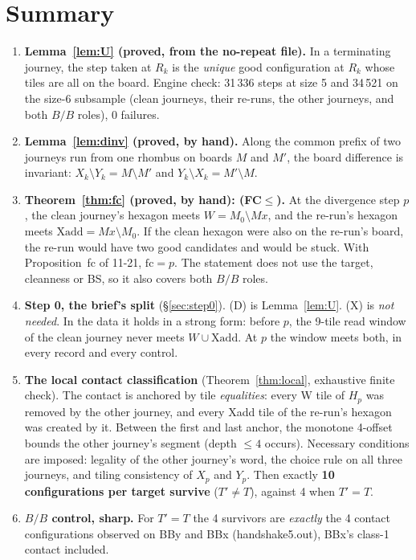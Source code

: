 \documentclass[11pt]{article}
\theoremstyle{definition}\newtheorem{definition}[theorem]{Definition}\newtheorem{remark}[theorem]{Remark}
\begin{document}
\section*{Summary}
\begin{enumerate}
\item \textbf{Lemma~\ref{lem:U} (proved, from the no-repeat file).} In a terminating journey, the step taken at $R_k$ is the \emph{unique} good configuration at $R_k$ whose tiles are all on the board. Engine check: 31\,336 steps at size 5 and 34\,521 on the size-6 subsample (clean journeys, their re-runs, the other journeys, and both $B/B$ roles), 0 failures.
\item \textbf{Lemma~\ref{lem:dinv} (proved, by hand).} Along the common prefix of two journeys run from one rhombus on boards $M$ and $M'$, the board difference is invariant: $X_k\setminus Y_k=M\setminus M'$ and $Y_k\setminus X_k=M'\setminus M$.
\item \textbf{Theorem~\ref{thm:fc} (proved, by hand): (FC$\le$).} At the divergence step $p$, the clean journey's hexagon meets $W=M_0\setminus Mx$, and the re-run's hexagon meets $\mathrm{Xadd}=Mx\setminus M_0$. If the clean hexagon were also on the re-run's board, the re-run would have two good candidates and would be stuck. With Proposition~fc of 11-21, $\mathrm{fc}=p$. The statement does not use the target, cleanness or BS, so it also covers both $B/B$ roles.
\item \textbf{Step 0, the brief's split} (\S\ref{sec:step0}). (D) is Lemma~\ref{lem:U}. (X) is \emph{not needed}. In the data it holds in a strong form: before $p$, the 9-tile read window of the clean journey never meets $W\cup\mathrm{Xadd}$. At $p$ the window meets both, in every record and every control.
\item \textbf{The local contact classification} (Theorem~\ref{thm:local}, exhaustive finite check). The contact is anchored by tile \emph{equalities}: every W tile of $H_p$ was removed by the other journey, and every Xadd tile of the re-run's hexagon was created by it. Between the first and last anchor, the monotone 4-offset bounds the other journey's segment (depth $\le4$ occurs). Necessary conditions are imposed: legality of the other journey's word, the choice rule on all three journeys, and tiling consistency of $X_p$ and $Y_p$. Then exactly \textbf{10 configurations per target survive} ($T'\ne T$), against 4 when $T'=T$.
\item \textbf{$B/B$ control, sharp.} For $T'=T$ the 4 survivors are \emph{exactly} the 4 contact configurations observed on BBy and BBx (handshake5.out), BBx's class-1 contact included.

\end{enumerate}
\end{document}
